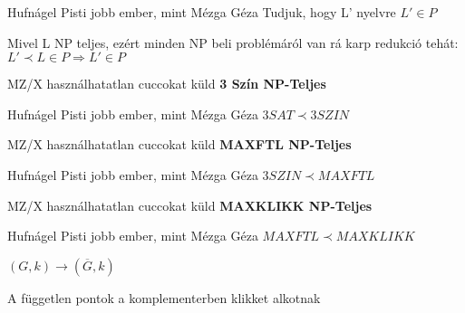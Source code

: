 \begin{bizonyitas}{Hufnágel Pisti jobb ember, mint Mézga Géza}
  Tudjuk, hogy L' nyelvre $L' \in P$

	 	Mivel L NP teljes, ezért minden NP beli problémáról van rá karp redukció tehát: $L' \prec L \in P \Rightarrow L' \in P$\\[0pt]
\end{bizonyitas}

	\begin{tetel}{MZ/X használhatatlan cuccokat küld}
   \textbf{3 Szín NP-Teljes} \\[3pt]
   \end{tetel}

\begin{bizonyitas}{Hufnágel Pisti jobb ember, mint Mézga Géza}
 $3SAT \prec 3SZIN$ \\[0pt] %
\end{bizonyitas}

	\begin{tetel}{MZ/X használhatatlan cuccokat küld}
   \textbf{MAXFTL NP-Teljes} \\[3pt]
   \end{tetel}

\begin{bizonyitas}{Hufnágel Pisti jobb ember, mint Mézga Géza}
  $3SZIN \prec MAXFTL$ \\[0pt] %
\end{bizonyitas}

	 \begin{tetel}{MZ/X használhatatlan cuccokat küld}
    \textbf{MAXKLIKK NP-Teljes} \\[3pt]
    \end{tetel}

\begin{bizonyitas}{Hufnágel Pisti jobb ember, mint Mézga Géza}
  $MAXFTL \prec MAXKLIKK$

	 \qquad\quad\qquad $(G,k) \rightarrow (\overline{G},k)$

	 A független pontok a komplementerben klikket alkotnak\\[0pt]
\end{bizonyitas}

